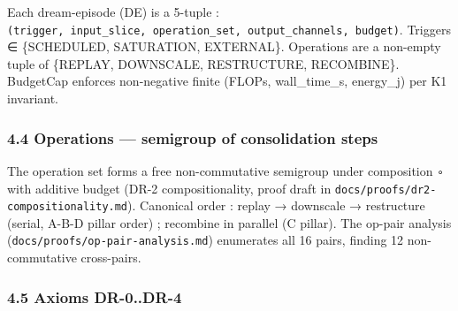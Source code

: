 \documentclass[
]{article}
\begin{document}
Each dream-episode (DE) is a 5-tuple :
\texttt{(trigger,\ input\_slice,\ operation\_set,\ output\_channels,\ budget)}.
Triggers ∈ \{SCHEDULED, SATURATION, EXTERNAL\}. Operations are a
non-empty tuple of \{REPLAY, DOWNSCALE, RESTRUCTURE, RECOMBINE\}.
BudgetCap enforces non-negative finite (FLOPs, wall\_time\_s, energy\_j)
per K1 invariant.

\subsubsection{4.4 Operations --- semigroup of consolidation
steps}\label{operations-semigroup-of-consolidation-steps}

The operation set forms a free non-commutative semigroup under
composition \texttt{∘} with additive budget (DR-2 compositionality,
proof draft in \texttt{docs/proofs/dr2-compositionality.md}). Canonical
order : replay → downscale → restructure (serial, A-B-D pillar order) ;
recombine in parallel (C pillar). The op-pair analysis
(\texttt{docs/proofs/op-pair-analysis.md}) enumerates all 16 pairs,
finding 12 non-commutative cross-pairs.

\subsubsection{4.5 Axioms DR-0..DR-4}\label{axioms-dr-0..dr-4}
\end{document}
